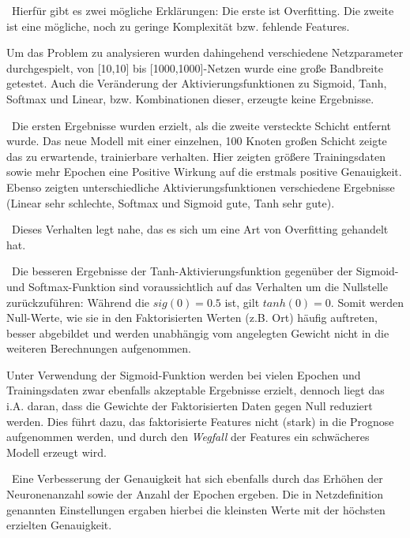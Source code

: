 ~\newline Hierfür gibt es zwei mögliche Erklärungen: Die erste ist Overfitting. Die zweite ist eine mögliche, noch zu geringe Komplexität bzw. fehlende Features. 

Um das Problem zu analysieren wurden dahingehend verschiedene Netzparameter durchgespielt, von [10,10] bis [1000,1000]-Netzen wurde eine große Bandbreite getestet. Auch die Veränderung der Aktivierungsfunktionen zu Sigmoid, Tanh, Softmax und Linear, bzw. Kombinationen dieser, erzeugte keine Ergebnisse. 

~\newline Die ersten Ergebnisse wurden erzielt, als die zweite versteckte Schicht entfernt wurde. Das neue Modell mit einer einzelnen, 100 Knoten großen Schicht zeigte das zu erwartende, trainierbare verhalten. Hier zeigten größere Trainingsdaten sowie mehr Epochen eine Positive Wirkung auf die erstmals positive Genauigkeit. Ebenso zeigten unterschiedliche Aktivierungsfunktionen verschiedene Ergebnisse (Linear sehr schlechte, Softmax und Sigmoid gute, Tanh sehr gute). 

~\newline Dieses Verhalten legt nahe, das es sich um eine Art von Overfitting gehandelt hat. 

~\newline Die besseren Ergebnisse der Tanh-Aktivierungsfunktion gegenüber der Sigmoid- und Softmax-Funktion sind voraussichtlich auf das Verhalten um die Nullstelle zurückzuführen: Während die $sig(0)=0.5$ ist, gilt $tanh(0)=0$. Somit werden Null-Werte, wie sie in den Faktorisierten Werten (z.B. Ort) häufig auftreten, besser abgebildet und werden unabhängig vom angelegten Gewicht nicht in die weiteren Berechnungen aufgenommen. 

Unter Verwendung der Sigmoid-Funktion werden bei vielen Epochen und Trainingsdaten zwar ebenfalls akzeptable Ergebnisse erzielt, dennoch liegt das i.A. daran, dass die Gewichte der Faktorisierten Daten gegen Null reduziert werden. Dies führt dazu, das faktorisierte Features nicht (stark) in die Prognose aufgenommen werden, und durch den \textit{Wegfall} der Features ein schwächeres Modell erzeugt wird. 

~\newline Eine Verbesserung der Genauigkeit hat sich ebenfalls durch das Erhöhen der Neuronenanzahl sowie der Anzahl der Epochen ergeben. Die in Netzdefinition genannten Einstellungen ergaben hierbei die kleinsten Werte mit der höchsten erzielten Genauigkeit.

